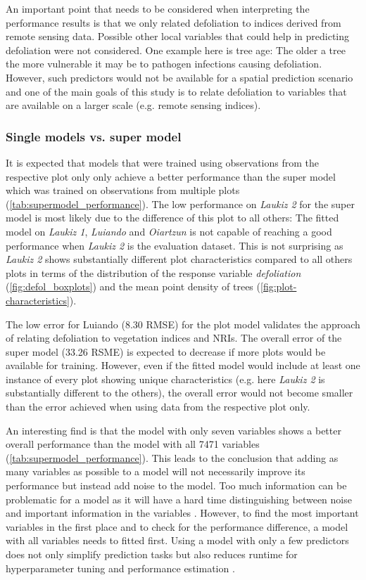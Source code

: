 \documentclass[review]{elsarticle}
\begin{document}
An important point that needs to be considered when interpreting the performance results is that we only related defoliation to indices derived from remote sensing data.
Possible other local variables that could help in predicting defoliation were not considered.
One example here is tree age: The older a tree the more vulnerable it may be to pathogen infections causing defoliation.
However, such predictors would not be available for a spatial prediction scenario and one of the main goals of this study is to relate defoliation to variables that are available on a larger scale (e.g. remote sensing indices).

\subsubsection{Single models vs. super model}

\noindent It is expected that models that were trained using observations from the respective plot only only achieve a better performance than the super model which was trained on observations from multiple plots (\autoref{tab:supermodel_performance}).
The low performance on \textit{Laukiz 2} for the super model is most likely due to the difference of this plot to all others: The fitted model on \textit{Laukiz 1}, \textit{Luiando} and \textit{Oiartzun} is not capable of reaching a good performance when \textit{Laukiz 2} is the evaluation dataset.
This is not surprising as \textit{Laukiz 2} shows substantially different plot characteristics compared to all others plots in terms of the distribution of the response variable \textit{defoliation} (\autoref{fig:defol_boxplots}) and the mean point density of trees (\autoref{fig:plot-characteristics}).

The low error for Luiando (8.30 RMSE) for the plot model validates the approach of relating defoliation to vegetation indices and NRIs.
The overall error of the super model (33.26 RSME) is expected to decrease if more plots would be available for training.
However, even if the fitted model would include at least one instance of every plot showing unique characteristics (e.g. here \textit{Laukiz 2} is substantially different to the others), the overall error would not become smaller than the error achieved when using data from the respective plot only.

An interesting find is that the model with only seven variables shows a better overall performance than the model with all 7471 variables (\autoref{tab:supermodel_performance}).
This leads to the conclusion that adding as many variables as possible to a model will not necessarily improve its performance but instead add noise to the model.
Too much information can be problematic for a model as it will have a hard time distinguishing between noise and important information in the variables \citep{liFeatureSelectionData2017, guyonIntroductionVariableFeature2003}.
However, to find the most important variables in the first place and to check for the performance difference, a model with all variables needs to fitted first.
Using a model with only a few predictors does not only simplify prediction tasks but also reduces runtime for hyperparameter tuning and performance estimation \citep{liuComputationalMethodsFeature2007}.
\end{document}
